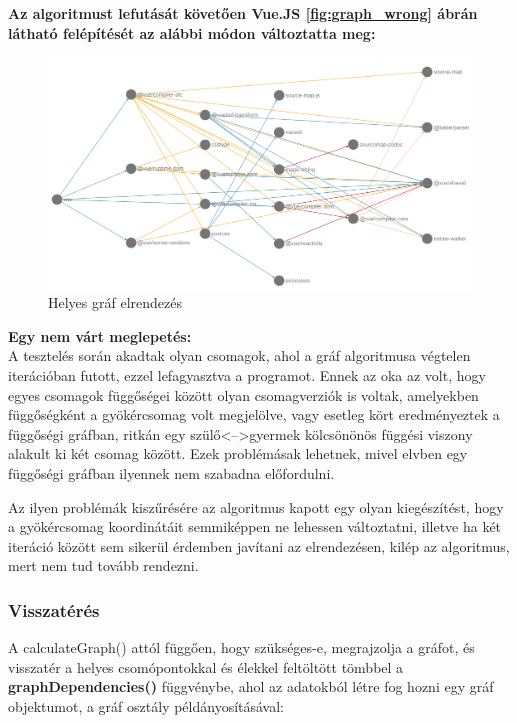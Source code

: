 \noindent\textbf{Az algoritmust lefutását követően Vue.JS \ref{fig:graph_wrong} ábrán látható felépítését az alábbi módon változtatta meg:}

\begin{figure}[!h]
	\centering
	\includegraphics[scale=0.4]{images/graph_right.png}
	\caption{Helyes gráf elrendezés}
	\label{fig:graph_right}
\end{figure}

\noindent\textbf{Egy nem várt meglepetés:}\\

A tesztelés során akadtak olyan csomagok, ahol a gráf algoritmusa végtelen iterációban futott, ezzel lefagyasztva a programot.
Ennek az oka az volt, hogy egyes csomagok függőségei között olyan csomagverziók is voltak, amelyekben függőségként a gyökércsomag volt megjelölve, vagy esetleg kört eredményeztek a függőségi gráfban, ritkán egy szülő<-->gyermek kölcsönönös függési viszony alakult ki két csomag között. Ezek problémásak lehetnek, mivel elvben egy függőségi gráfban ilyennek nem szabadna előfordulni.

Az ilyen problémák kiszűrésére az algoritmus kapott egy olyan kiegészítést, hogy a gyökércsomag koordinátáit semmiképpen ne lehessen változtatni, illetve ha két iteráció között sem sikerül érdemben javítani az elrendezésen, kilép az algoritmus, mert nem tud tovább rendezni.\\

\subsubsection{Visszatérés}

A calculateGraph() attól függően, hogy szükséges-e, megrajzolja a gráfot, és visszatér a helyes csomópontokkal és élekkel feltöltött tömbbel a \textbf{graphDependencies()} függvénybe, ahol az adatokból létre fog hozni egy gráf objektumot, a gráf osztály példányosításával:

